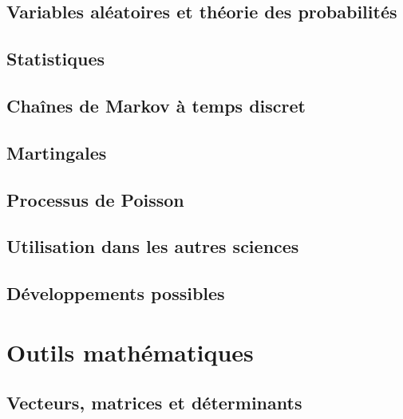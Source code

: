 \chapter{Variables aléatoires et théorie des probabilités}




\chapter{Statistiques}


\chapter{Chaînes de Markov à temps discret}


\chapter{Martingales}


\chapter{Processus de Poisson}


\chapter{Utilisation dans les autres sciences}


\chapter{Développements possibles}


\part{Outils mathématiques}         %

\chapter{Vecteurs, matrices et déterminants}


